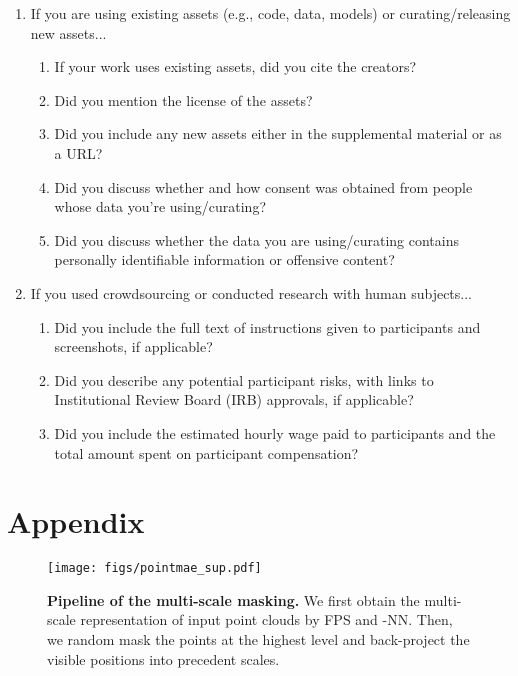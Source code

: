 \documentclass{article}
\makeatletter
\newcommand\figcaption{\def\@captype{figure}\caption}
\makeatother
\begin{document}
\begin{enumerate}
\item If you are using existing assets (e.g., code, data, models) or curating/releasing new assets...
\begin{enumerate}
  \item If your work uses existing assets, did you cite the creators?
    \answerYes{}
  \item Did you mention the license of the assets?
    \answerNA{}
  \item Did you include any new assets either in the supplemental material or as a URL?
    \answerYes{}
  \item Did you discuss whether and how consent was obtained from people whose data you're using/curating?
    \answerNA{}
  \item Did you discuss whether the data you are using/curating contains personally identifiable information or offensive content?
    \answerNA{}
\end{enumerate}


\item If you used crowdsourcing or conducted research with human subjects...
\begin{enumerate}
  \item Did you include the full text of instructions given to participants and screenshots, if applicable?
    \answerNA{}
  \item Did you describe any potential participant risks, with links to Institutional Review Board (IRB) approvals, if applicable?
    \answerNA{}
  \item Did you include the estimated hourly wage paid to participants and the total amount spent on participant compensation?
    \answerNA{}
\end{enumerate}
\end{enumerate}


\clearpage



\section{Appendix}

\begin{figure*}[h]
  \centering
    \texttt{[image: figs/pointmae\_sup.pdf]}
    \vspace{-0.1cm}
   \figcaption{\textbf{Pipeline of the multi-scale masking.} We first obtain the multi-scale representation of input point clouds by FPS and -NN. Then, we random mask the points at the highest level and back-project the visible positions into precedent scales.}
    \label{pipline}
\end{figure*}
\end{document}
